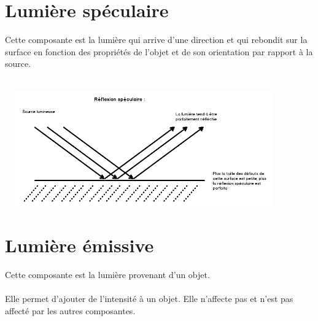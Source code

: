 \section{Lumière spéculaire}
Cette composante est la lumière qui arrive d'une direction et qui rebondit sur la surface en fonction des propriétés de l'objet et de son orientation par rapport à la source.
\\\\
\begin{center}
\includegraphics[width=12cm,height=5cm]{pipeline/images/reflexion_speculaire.png}
\end{center}

\section{Lumière émissive}
Cette composante est la lumière provenant d'un objet.
\\\\
Elle permet d'ajouter de l'intensité à un objet.
Elle n'affecte pas et n'est pas affecté par les autres composantes.